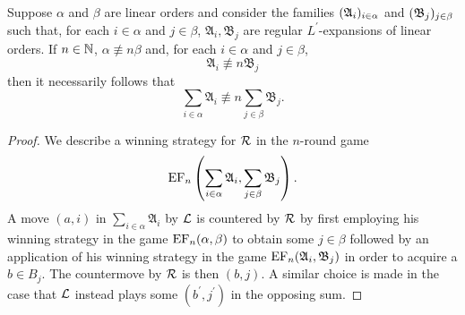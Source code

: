 \begin{prp}
	Suppose $\alpha$ and $\beta$ are linear orders and consider the families $(\mathfrak{A}_i)_{i\in\alpha}$ and $(\mathfrak{B}_j)_{j\in\beta}$ such that, for each $i\in\alpha$ and $j\in\beta$, $\mathfrak{A}_i,\mathfrak{B}_j$ are regular $L^\prime$-expansions of linear orders.  If $n\in\mathbb{N}$, $\alpha\nequiv{n}\beta$ and, for each $i\in\alpha$ and $j\in\beta$,
	\begin{equation}
		\mathfrak{A}_i\nequiv{n}\mathfrak{B}_j
	\end{equation}
	then it necessarily follows that
	\begin{equation}
		\sum_{i\in\alpha}\mathfrak{A}_i\nequiv{n}\sum_{j\in\beta}\mathfrak{B}_j.
	\end{equation}
\end{prp}
\begin{proof}
	We describe a winning strategy for $\mathcal{R}$ in the $n$-round game
	\begin{equation}
		\operatorname{EF}_n\left(\sum_{i\in\alpha}\mathfrak{A}_i,\sum_{j\in\beta}\mathfrak{B}_j\right).
	\end{equation}
	A move $(a,i)$ in $\sum_{i\in\alpha}\mathfrak{A}_i$ by $\mathcal{L}$ is countered by $\mathcal{R}$ by first employing his winning strategy in the game $\operatorname{EF}_n(\alpha,\beta)$ to obtain some $j\in\beta$ followed by an application of his winning strategy in the game $\operatorname{EF}_n(\mathfrak{A}_i,\mathfrak{B}_j)$ in order to acquire a $b\in B_j$.  The countermove by $\mathcal{R}$ is then $(b,j)$.  A similar choice is made in the case that $\mathcal{L}$ instead plays some $(b^\prime,j^\prime)$ in the opposing sum.
\end{proof}

